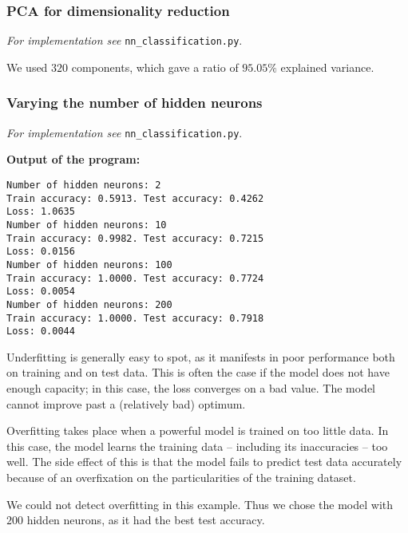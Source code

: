     \subsubsection{PCA for dimensionality reduction}
    \textit{For implementation see } \texttt{nn\_classification.py}.

    We used $320$ components, which gave a ratio of $95.05\%$ explained variance.

    \subsubsection{Varying the number of hidden neurons}
    \textit{For implementation see } \texttt{nn\_classification.py}.

    \textbf{Output of the program:}
    \begin{lstlisting}
Number of hidden neurons: 2
Train accuracy: 0.5913. Test accuracy: 0.4262
Loss: 1.0635
Number of hidden neurons: 10
Train accuracy: 0.9982. Test accuracy: 0.7215
Loss: 0.0156
Number of hidden neurons: 100
Train accuracy: 1.0000. Test accuracy: 0.7724
Loss: 0.0054
Number of hidden neurons: 200
Train accuracy: 1.0000. Test accuracy: 0.7918
Loss: 0.0044
    \end{lstlisting}

    Underfitting is generally easy to spot, as it manifests in poor performance both on training and on test data.
    This is often the case if the model does not have enough capacity; in this case, the loss converges on a bad value.
    The model cannot improve past a (relatively bad) optimum.

    Overfitting takes place when a powerful model is trained on too little data.
    In this case, the model learns the training data -- including its inaccuracies -- too well.
    The side effect of this is that the model fails to predict test data accurately because of an overfixation on the particularities of the training dataset.

    We could not detect overfitting in this example.
    Thus we chose the model with $200$ hidden neurons, as it had the best test accuracy.



